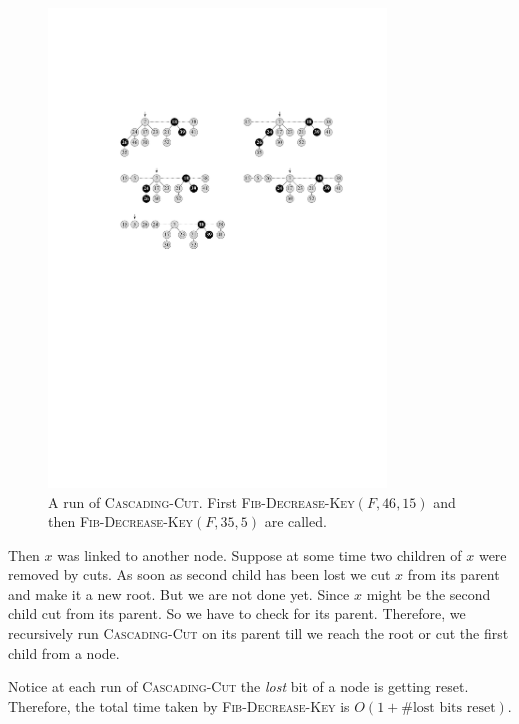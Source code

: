 \begin{figure}[h!]
	\centering
	\includegraphics[width=0.8\textwidth]{images/Fibheap3.pdf}
	\caption{A run of \textsc{Cascading-Cut}. First \textsc{Fib-Decrease-Key}$(F,46,15)$ and then \textsc{Fib-Decrease-Key}$(F,35,5)$ are called.}
\end{figure}Then $x$ was linked to another node. Suppose at some time two children of $x$ were removed by cuts. As soon as second child has been lost we cut $x$ from its parent and make it a new root. But we are not done yet. Since $x$ might be the second child cut from its parent. So we have to check for its parent. Therefore, we recursively run \textsc{Cascading-Cut} on its parent till we reach the root or cut the first child from a node.

Notice at each run of \textsc{Cascading-Cut} the \emph{lost} bit of a node is getting reset. Therefore, the total time taken by \textsc{Fib-Decrease-Key} is $O(1+\#\text{lost bits reset})$.
